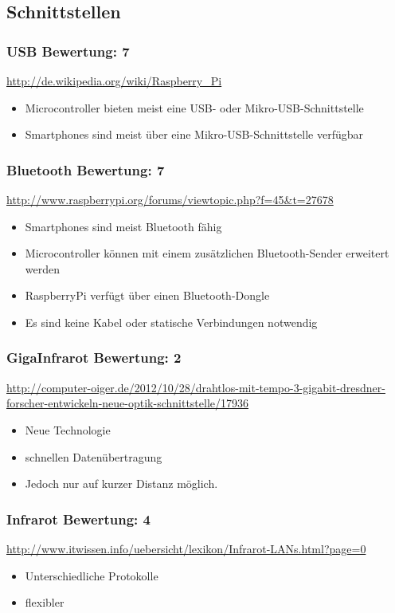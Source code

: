 \subsection{Schnittstellen}

\subsubsection{USB  \hfill Bewertung: 7}
\url{http://de.wikipedia.org/wiki/Raspberry_Pi}
\begin{itemize}
    \item Microcontroller bieten meist eine USB- oder Mikro-USB-Schnittstelle
    \item Smartphones sind meist über eine Mikro-USB-Schnittstelle verfügbar
\end{itemize}

\subsubsection{Bluetooth  \hfill Bewertung: 7}
\url{http://www.raspberrypi.org/forums/viewtopic.php?f=45&t=27678}
\begin{itemize}
    \item Smartphones sind meist Bluetooth fähig
    \item Microcontroller können mit einem zusätzlichen Bluetooth-Sender erweitert werden
    \item RaspberryPi verfügt über einen Bluetooth-Dongle
    \item Es sind keine Kabel oder statische Verbindungen notwendig
\end{itemize}

\subsubsection{GigaInfrarot  \hfill Bewertung: 2}
\url{http://computer-oiger.de/2012/10/28/drahtlos-mit-tempo-3-gigabit-dresdner-forscher-entwickeln-neue-optik-schnittstelle/17936}
\begin{itemize}
    \item Neue Technologie
    \item schnellen Datenübertragung
    \item Jedoch nur auf kurzer Distanz möglich.
\end{itemize}

\subsubsection{Infrarot  \hfill Bewertung: 4}
\url{http://www.itwissen.info/uebersicht/lexikon/Infrarot-LANs.html?page=0}
\begin{itemize}
    \item Unterschiedliche Protokolle
    \item flexibler
\end{itemize}

